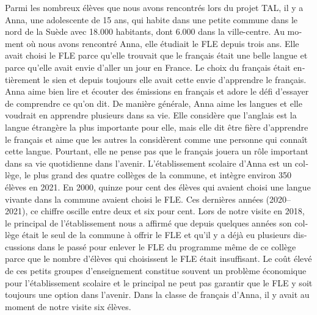 \documentclass[french, output=paper]{langscibook}
\begin{document}
\begin{otherlanguage}{french}
Parmi les nombreux élèves que nous avons rencontrés lors du projet TAL, il y a Anna, une adolescente de 15 ans, qui habite dans une petite commune dans le nord de la Suède avec 18.000 habitants, dont 6.000 dans la ville-centre. Au moment où nous avons rencontré Anna, elle étudiait le FLE depuis trois ans. Elle avait choisi le FLE parce qu’elle trouvait que le français était une belle langue et parce qu’elle avait envie d’aller un jour en France. Le choix du français était entièrement le sien et depuis toujours elle avait cette envie d’apprendre le français. Anna aime bien lire et écouter des émissions en français et adore le défi d’essayer de comprendre ce qu’on dit. De manière générale, Anna aime les langues et elle voudrait en apprendre plusieurs dans sa vie. Elle considère que l’anglais est la langue étrangère la plus importante pour elle, mais elle dit être fière d’apprendre le français et aime que les autres la considèrent comme une personne qui connaît cette langue. Pourtant, elle ne pense pas que le français jouera un rôle important dans sa vie quotidienne dans l’avenir. L’établissement scolaire d’Anna est un collège, le plus grand des quatre collèges de la commune, et intègre environ 350 élèves en 2021. En 2000, quinze pour cent des élèves qui avaient choisi une langue vivante dans la commune avaient choisi le FLE. Ces dernières années (2020--2021), ce chiffre oscille entre deux et six pour cent. Lors de notre visite en 2018, le principal de l’établissement nous a affirmé que depuis quelques années son collège était le seul de la commune à offrir le FLE et qu’il y a déjà eu plusieurs discussions dans le passé pour enlever le FLE du programme même de ce collège parce que le nombre d’élèves qui choisissent le FLE était insuffisant. Le coût élevé de ces petits groupes d’enseignement constitue souvent un problème économique pour l’établissement scolaire et le principal ne peut pas garantir que le FLE y soit toujours une option dans l’avenir. Dans la classe de français d’Anna, il y avait au moment de notre visite six élèves.\largerpage


\end{otherlanguage}
\end{document}
